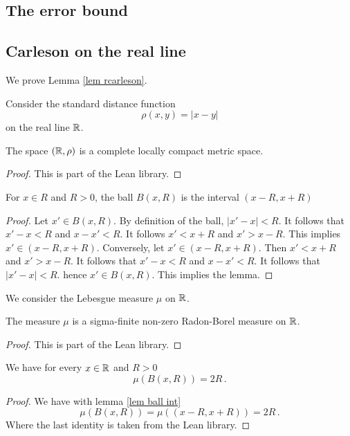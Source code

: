 {\subsection{The error bound}
\label{10difference}

\subsection{Carleson on the real line}
\label{10carleson}

We prove Lemma \ref{lem rcarleson}.

Consider the standard distance function
\begin{equation}
    \rho(x,y)=|x-y|
\end{equation}
on the real line $\mathbb{R}$.
\begin{lemma}
The space $(\mathbb{R},\rho)$ is a complete locally compact metric space.
\end{lemma}
\begin{proof}
    This is part of the Lean library.
\end{proof}
\begin{lemma}\label{lem ball int}
    For $x\in R$ and $R>0$, the ball $B(x,R)$ is the interval $(x-R,x+R)$
\end{lemma}
\begin{proof}
Let $x'\in B(x,R)$. By definition of the ball,
$|x'-x|<R$. It follows that $x'-x<R$ and $x-x'<R$.
It follows $x'<x+R$ and $x'>x-R$. This implies
$x'\in (x-R,x+R)$.
Conversely, let $x'\in (x-R,x+R)$. Then
$x'<x+R$ and $x'>x-R$. It follows that
$x'-x<R$ and $x-x'<R$. It follows that $|x'-x|<R$.
hence $x'\in B(x,R)$.
This implies the lemma.
\end{proof}
We consider the Lebesgue measure $\mu$ on $\mathbb{R}$.
\begin{lemma}
    The measure $\mu$ is a sigma-finite non-zero
    Radon-Borel measure on $\mathbb{R}$.
\end{lemma}
\begin{proof}
    This is part of the Lean library.
\end{proof}
\begin{lemma}\label{lem ball meas}
    We have for every $x\in \mathbb{R}$ and $R>0$
    \begin{equation}
        \mu(B(x,R))=2R\, .
    \end{equation}
\end{lemma}
\begin{proof}
We have with lemma \ref{lem ball int}
\begin{equation}
    \mu(B(x,R))=\mu((x-R,x+R))=2R\, .
\end{equation}
Where the last identity is taken from the Lean library. 
\end{proof}

}
